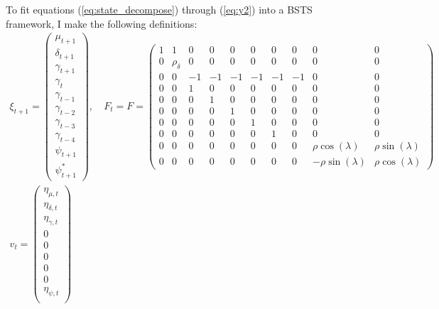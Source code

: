 \documentclass[10pt, titlepage]{article}
\numberwithin{equation}{section}
\begin{document}
To fit equations (\ref{eq:state_decompose}) through (\ref{eq:y2}) into a BSTS framework, I make the following definitions:
\begin{align*}
    \xi_{t+1} = \begin{pmatrix}
        \mu_{t+1} \\
        \delta_{t+1} \\
        \gamma_{t+1} \\
        \gamma_t \\
        \gamma_{t-1} \\
        \gamma_{t-2} \\
        \gamma_{t-3} \\
        \gamma_{t-4} \\
        \psi_{t+1} \\
        \psi_{t+1}^{*}
    \end{pmatrix}, 
    &\ 
    F_t = F = \begin{pmatrix}
        1 & 1  & 0 & 0 & 0 & 0 & 0 & 0 & 0 & 0 \\
        0 & \rho_{\delta}  & 0 & 0 & 0 & 0 & 0 & 0 & 0 & 0 \\
        0 & 0 & -1 & -1 & -1 & -1 & -1 & -1 & 0 & 0 \\
        0 & 0 & 1 & 0 & 0 & 0 & 0 & 0 & 0 & 0 \\
        0 & 0 & 0 & 1 & 0 & 0 & 0 & 0 & 0 & 0 \\
        0 & 0 & 0 & 0 & 1 & 0 & 0 & 0 & 0 & 0 \\
        0 & 0 & 0 & 0 & 0 & 1 & 0 & 0 & 0 & 0 \\
        0 & 0 & 0 & 0 & 0 & 0 & 1 & 0 & 0 & 0 \\
        0 & 0 & 0 & 0 & 0 & 0 & 0 & 0 & \rho \cos(\lambda) & \rho \sin(\lambda) \\
        0 & 0 & 0 & 0 & 0 & 0 & 0 & 0 & -\rho \sin(\lambda) & \rho \cos(\lambda)
    \end{pmatrix} \\
    v_t = \begin{pmatrix}
        \eta_{\mu,t} \\
        \eta_{\delta,t} \\
        \eta_{\gamma,t} \\
        0 \\
        0 \\
        0 \\
        0 \\
        0 \\
        \eta_{\psi,t} \\

\end{pmatrix}
\end{align*}
\end{document}
